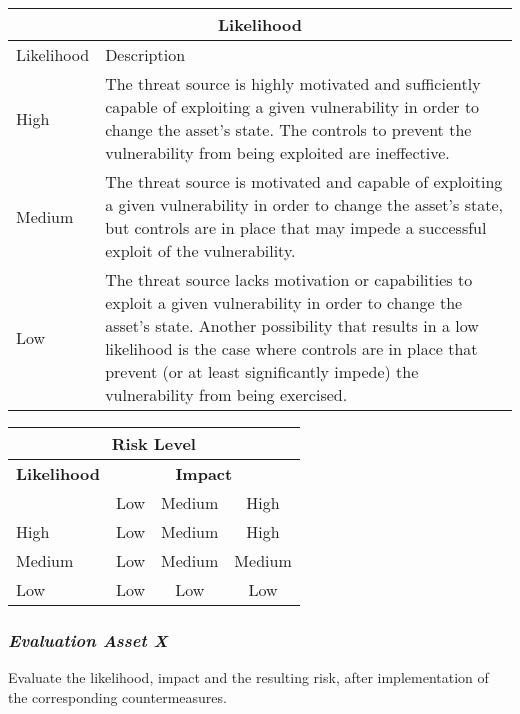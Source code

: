 \documentclass{article}
\begin{document}
\begin{center}
\begin{tabular}{|l|p{10cm}|}
\hline
\multicolumn{2}{|c|}{\bf Likelihood} \\
\hline
Likelihood & Description \\
\hline
\hline
High   & \hspace*{20pt}
The threat source is highly motivated and sufficiently capable of exploiting a given vulnerability in order to change the asset's state. The controls to prevent the vulnerability from being exploited are ineffective. \\
\hline
Medium & \hspace*{20pt}
The threat source is motivated and capable of exploiting a given vulnerability in order to change the asset's state, but controls are in place that may impede a successful exploit of the vulnerability. \\
\hline
Low   & \hspace*{20pt}
The threat source lacks motivation or capabilities to exploit a given vulnerability in order to change the asset's state. Another possibility that results in a low likelihood is the case where controls are in place that prevent (or at least significantly impede) the vulnerability from being exercised. \\
\hline
\end{tabular}
\end{center}

\vspace{5mm}

\begin{center}
\begin{tabular}{|l|c|c|c|}
\hline
\multicolumn{4}{|c|}{{\bf Risk Level}} \\
\hline
{{\bf Likelihood}} & \multicolumn{3}{c|}{{\bf Impact}} \\ %
     & Low & Medium & High \\  \hline
 High & Low & Medium & High  \\
\hline
 Medium & Low & Medium & Medium \\
\hline
 Low & Low & Low & Low \\
\hline
\end{tabular}
\end{center}

\subsubsection{{\it Evaluation Asset X}}

Evaluate the likelihood, impact and the resulting risk,  after implementation of the corresponding countermeasures.
\end{document}
